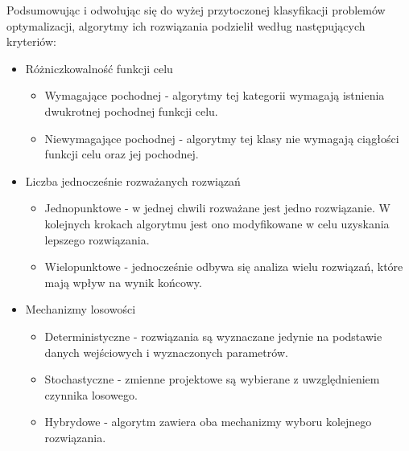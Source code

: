 Podsumowując i odwołując się do wyżej przytoczonej klasyfikacji problemów optymalizacji, algorytmy ich rozwiązania \cite{Tesch2016} podzielił według następujących kryteriów:
\begin{itemize}[noitemsep]
	\item Różniczkowalność funkcji celu
	\begin{itemize}[noitemsep]
		\item Wymagające pochodnej - algorytmy tej kategorii wymagają istnienia dwukrotnej pochodnej funkcji celu.
		\item Niewymagające pochodnej - algorytmy tej klasy nie wymagają ciągłości funkcji celu oraz jej pochodnej.
	\end{itemize}
	\item Liczba jednocześnie rozważanych rozwiązań
	\begin{itemize}[noitemsep]
		\item Jednopunktowe - w jednej chwili rozważane jest jedno rozwiązanie. W kolejnych krokach algorytmu jest ono modyfikowane w celu uzyskania lepszego rozwiązania.
		\item Wielopunktowe - jednocześnie odbywa się analiza wielu rozwiązań, które mają wpływ na wynik końcowy.
	\end{itemize}
	\item Mechanizmy losowości
	\begin{itemize}[noitemsep]
		\item Deterministyczne - rozwiązania są wyznaczane jedynie na podstawie danych wejściowych i wyznaczonych parametrów.
		\item Stochastyczne - zmienne projektowe są wybierane z uwzględnieniem czynnika losowego.
		\item Hybrydowe - algorytm zawiera oba mechanizmy wyboru kolejnego rozwiązania.
	\end{itemize}
\end{itemize}

